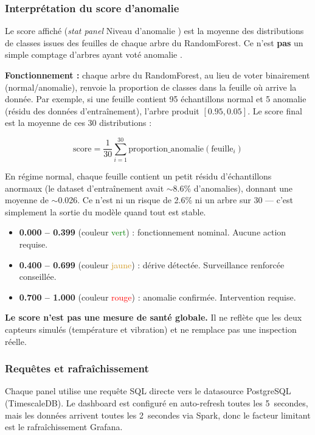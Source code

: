 \documentclass[12pt,a4paper]{article}
\begin{document}
\subsubsection{Interprétation du score d'anomalie}

Le score affiché (\textit{stat panel} \og Niveau d'anomalie \fg) est la moyenne des distributions de classes issues des feuilles de chaque arbre du RandomForest. Ce n'est \textbf{pas} un simple comptage d'arbres ayant voté \og anomalie \fg{}.

\noindent\textbf{Fonctionnement :} chaque arbre du RandomForest, au lieu de voter binairement (normal/anomalie), renvoie la proportion de classes dans la feuille où arrive la donnée. Par exemple, si une feuille contient 95 échantillons \og normal \fg{} et 5 \og anomalie \fg{} (résidu des données d'entraînement), l'arbre produit $[0.95, 0.05]$. Le score final est la moyenne de ces 30 distributions :

\[
\text{score} = \frac{1}{30} \sum_{i=1}^{30} \text{proportion\_anomalie}(\text{feuille}_i)
\]

En régime normal, chaque feuille contient un petit résidu d'échantillons anormaux (le dataset d'entraînement avait $\sim$8.6\% d'anomalies), donnant une moyenne de $\sim$0.026. Ce n'est ni un risque de 2.6\% ni un arbre sur 30 — c'est simplement la sortie du modèle quand tout est stable.

\begin{itemize}
    \item \textbf{0.000 -- 0.399} (couleur \textcolor{green}{vert}) : fonctionnement nominal. Aucune action requise.
    \item \textbf{0.400 -- 0.699} (couleur \textcolor{#d29922}{jaune}) : dérive détectée. Surveillance renforcée conseillée.
    \item \textbf{0.700 -- 1.000} (couleur \textcolor{red}{rouge}) : anomalie confirmée. Intervention requise.
\end{itemize}

\textbf{Le score n'est pas une mesure de santé globale.} Il ne reflète que les deux capteurs simulés (température et vibration) et ne remplace pas une inspection réelle.

\subsubsection{Requêtes et rafraîchissement}

Chaque panel utilise une requête SQL directe vers le datasource PostgreSQL (TimescaleDB). Le dashboard est configuré en auto-refresh toutes les 5~secondes, mais les données arrivent toutes les 2~secondes via Spark, donc le facteur limitant est le rafraîchissement Grafana.
\end{document}
